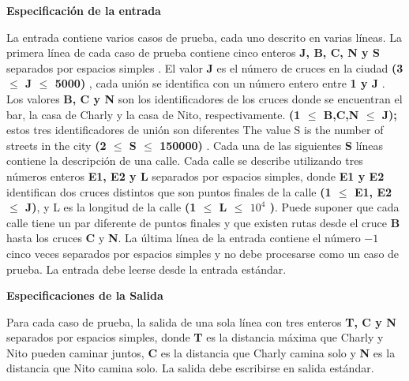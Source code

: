\documentclass{article}
\begin{document}
    \begin{flushleft}
        {\bf Especificaci\'on de la entrada }
    \end{flushleft}
    
    \begin{flushleft}
    La entrada contiene varios casos de prueba, cada uno descrito 
    en varias l\'ineas. La primera l\'inea de cada caso de prueba
    contiene cinco enteros {\bf J, B, C, N y S} separados por espacios
    simples . El valor {\bf J} es el n\'umero de cruces en la ciudad
    {\bf  (3 $\leq$ J $\leq$ 5000)} , cada uni\'on se identifica con un
    n\'umero entero entre {\bf 1 y J} . Los valores {\bf B, C y N} son 
    los identificadores de los cruces donde se encuentran el bar,
    la casa de Charly y la casa de Nito, respectivamente. {\bf (1 $\leq$ B,C,N $\leq$ J);}
    estos tres identificadores de uni\'on son diferentes 
    The value S is the number of streets in the city 
    {\bf (2 $\leq$ S $\leq$ 150000)} .
    Cada una de las siguientes {\bf S} l\'ineas  contiene la descripci\'on de una calle. 
    Cada calle se describe utilizando tres n\'umeros enteros {\bf E1, E2 y L} separados 
    por espacios simples, donde {\bf E1 y E2} identifican dos cruces distintos que son
    puntos finales de la calle {\bf (1 $\leq$ E1, E2 $\leq$ J)}, y L es la longitud de 
    la calle {\bf(1 $\leq$ L $\leq$ $10^4$ )}. Puede suponer que 
    cada calle tiene un par diferente de puntos finales y 
    que existen rutas desde el cruce {\bf B} hasta los cruces {\bf C} y {\bf N}. 
    La \'ultima l\'inea de la entrada contiene 
    el n\'umero $-1$ cinco veces separados por espacios simples y no debe procesarse como
    un caso de prueba. La entrada debe leerse desde la entrada est\'andar. 
    \end{flushleft}


    \begin{flushleft}
        {\bf Especificaciones de la Salida}
    \end{flushleft}

    \begin{flushleft}
        Para cada caso de prueba, la salida de una sola l\'inea 
        con tres enteros {\bf T, C y N } separados por espacios
        simples, donde {\bf T} es la distancia m\'axima que 
        Charly y Nito pueden caminar juntos, {\bf C} es la 
        distancia que Charly camina solo y {\bf N} es la distancia 
        que Nito camina solo. La salida debe escribirse en salida
        est\'andar.
    \end{flushleft}
\end{document}
